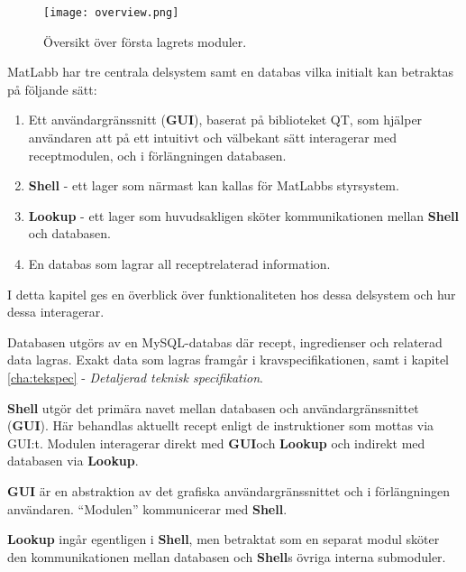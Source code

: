 
\begin{figure}[h]
\centering
\texttt{[image: overview.png]}
\caption{Översikt över första lagrets moduler.}
\label{fig:overview}
\end{figure}

MatLabb har tre centrala delsystem samt en databas vilka initialt kan betraktas på följande sätt: 
\begin{enumerate}
  \item Ett användargränssnitt (\textbf{GUI}), baserat på biblioteket QT, som hjälper användaren att på ett intuitivt och välbekant sätt interagerar med receptmodulen, och i förlängningen databasen.
  \item \textbf{Shell} - ett lager som närmast kan kallas för MatLabbs styrsystem.
  \item \textbf{Lookup} - ett lager som huvudsakligen sköter kommunikationen mellan \textbf{Shell} och databasen. 
  \item En databas som lagrar all receptrelaterad information.
\end{enumerate}
I detta kapitel ges en överblick över funktionaliteten hos dessa delsystem och hur dessa interagerar.

Databasen utgörs av en MySQL-databas där recept, ingredienser och relaterad data lagras. Exakt data som lagras framgår i kravspecifikationen, samt i kapitel \ref{cha:tekspec} - \emph{Detaljerad teknisk specifikation}.

\textbf{Shell} utgör det primära navet mellan databasen och användargränssnittet (\textbf{GUI}). Här behandlas aktuellt recept enligt de instruktioner som mottas via GUI:t. Modulen interagerar direkt med \textbf{GUI}och \textbf{Lookup} och indirekt med databasen via \textbf{Lookup}.

\textbf{GUI} är en abstraktion av det grafiska användargränssnittet och i förlängningen användaren. ``Modulen'' kommunicerar med \textbf{Shell}.

\textbf{Lookup} ingår egentligen i \textbf{Shell}, men betraktat som en separat modul sköter den kommunikationen mellan databasen och \textbf{Shell}s övriga interna submoduler.
